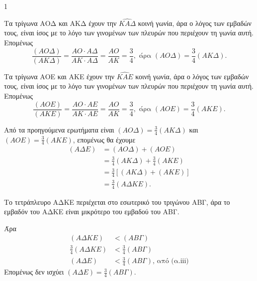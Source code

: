 \begin{ylh}{1}
    \item [ΛΥΣΗ]
\end{ylh}

\begin{alist}
    \item 
    \begin{rlist}
        \item Τα τρίγωνα ΑΟΔ και ΑΚΔ έχουν την $\widehat{ΚΑΔ}$ κοινή γωνία, άρα ο λόγος των εμβαδών τους, είναι ίσος με το λόγο των γινομένων των πλευρών που περιέχουν τη γωνία αυτή. Επομένως
        \[
            \frac{(ΑΟΔ)}{(ΑΚΔ)} = \frac{ΑΟ \cdot ΑΔ}{ΑΚ \cdot ΑΔ} = \frac{ΑΟ}{ΑΚ} = \frac{3}{4}, \text{ άρα } (ΑΟΔ) = \frac{3}{4}(ΑΚΔ).
        \]

        \item Τα τρίγωνα ΑΟΕ και ΑΚΕ έχουν την $\widehat{ΚΑΕ}$ κοινή γωνία, άρα ο λόγος των εμβαδών τους, είναι ίσος με το λόγο των γινομένων των πλευρών που περιέχουν τη γωνία αυτή. Επομένως
        \[
            \frac{(ΑΟΕ)}{(ΑΚΕ)} = \frac{ΑΟ \cdot ΑΕ}{ΑΚ \cdot ΑΕ} = \frac{ΑΟ}{ΑΚ} = \frac{3}{4}, \text{ άρα } (ΑΟΕ) = \frac{3}{4}(ΑΚΕ).
        \]
        
        \item Από τα προηγούμενα ερωτήματα είναι $(ΑΟΔ) = \frac{3}{4}(ΑΚΔ)$ και $(ΑΟΕ) = \frac{3}{4}(ΑΚΕ)$, επομένως θα έχουμε
        \begin{align*}
            (ΑΔΕ) &= (ΑΟΔ) + (ΑΟΕ) \\
            &= \frac{3}{4}(ΑΚΔ) + \frac{3}{4}(ΑΚΕ) \\
            &= \frac{3}{4}[(ΑΚΔ) + (ΑΚΕ)] \\
            &= \frac{3}{4}(ΑΔΚΕ).
        \end{align*}
    \end{rlist}
    \item Το τετράπλευρο ΑΔΚΕ περιέχεται στο εσωτερικό του τριγώνου ΑΒΓ, άρα το εμβαδόν του ΑΔΚΕ είναι μικρότερο του εμβαδού του ΑΒΓ.
    
    Άρα
    \begin{align*}
    (ΑΔΚΕ) &< (ΑΒΓ) \\
    \frac{3}{4}(ΑΔΚΕ) &< \frac{3}{4}(ΑΒΓ) \\
    (ΑΔΕ) &< \frac{3}{4}(ΑΒΓ) \text{, από (α.iii)}
    \end{align*}
    Επομένως δεν ισχύει $(ΑΔΕ) = \frac{3}{4}(ΑΒΓ)$.
\end{alist}